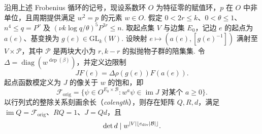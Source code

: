 \begin{lemma}[起点函数的基与端点余长]
\label{lem:a-edge-origin-basis}
\emitthmsource
沿用上述 Frobenius 循环的记号，现设系数环 $O$ 为特征零的赋值环，$p$ 在 $O$ 中非单位，且周期提供满足 $w^2=p$ 的元素 $w\in O$. 假定 $0<2r\le k$、$0<\theta\le1$、$n^4\le q=P^\nu$ 及 $(\nu k\log q/\theta)^5P^{3r}\le n$. 取起点集 $V$ 与边集 $E_0$，记边 $e$ 的起点为 $a(e)$、基变换为 $g(e)\in\mathrm{GL}_k(W)$. 设映射 $e\mapsto(a(e),[g(e)^{-1}])$ 满射至 $V\times\mathcal P$，其中 $\mathcal P$ 是两块大小为 $r,k-r$ 的拟抛物子群的陪集集. 令 $\Delta=\operatorname{diag}(w^{\operatorname{dep}(\beta)})$，并定义边限制
\[
 JF(e)=\Delta\rho(g(e))F(a(e)).
\]
起点函数模定义为 $J$ 的像关于 $w$ 的饱和，即
\[
 \mathcal F_{\mathrm{orig}}
   =\{\psi\in O^{E_0\times\mathcal B}:
                          w^a\psi\in\operatorname{im}J
                          \text{ 对某个 }a\ge0\}.
\]
以行列式的整除关系刻画余长（\emph{colength}），则存在矩阵 $Q,R,d$，满足 $\operatorname{im}Q=\mathcal F_{\mathrm{orig}}$、$RQ=1$、$J=Qd$，且
\[
 \det d\mid w^{|V|\lfloor c_{\rm div}|\mathcal B|\rfloor}.
\]
\end{lemma}
